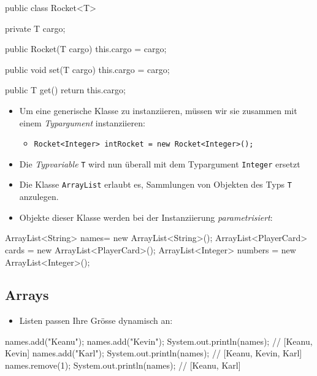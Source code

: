 \documentclass[a4paper,10pt, dvipsnames]{report}
\newcommand{\javaInLine}[1]{\texttt{#1}}
\begin{document}
\begin{javacodebox}
public class Rocket<T> {

    private T cargo;

    public Rocket(T cargo) {
    this.cargo = cargo;
    }

    public void set(T cargo) {
    this.cargo = cargo;
    }

    public T get() {
    return this.cargo;
    }
}
\end{javacodebox}

\begin{itemize}
    \item Um eine generische Klasse zu instanziieren, müssen wir sie zusammen mit einem \textit{Typargument} instanziieren:
    \begin{itemize}
        \item \javaInLine{Rocket<Integer> intRocket = new Rocket<Integer>();}
    \end{itemize}
    \item Die \textit{Typvariable} \javaInLine{T} wird nun überall mit dem Typargument \javaInLine{Integer} ersetzt
    \item Die Klasse \javaInLine{ArrayList} erlaubt es, Sammlungen von Objekten des Typs \javaInLine{T} anzulegen.
    \item Objekte dieser Klasse werden bei der Instanziierung \textit{parametrisiert}:
\end{itemize}

\begin{javacodebox}
ArrayList<String> names= new ArrayList<String>();
ArrayList<PlayerCard> cards = new ArrayList<PlayerCard>();
ArrayList<Integer> numbers = new ArrayList<Integer>();
\end{javacodebox}

\subsection{Arrays}

\begin{itemize}
    \item Listen passen Ihre Grösse dynamisch an:
\end{itemize}

\begin{javacodebox}
names.add("Keanu");
names.add("Kevin");
System.out.println(names); // [Keanu, Kevin]
names.add("Karl");
System.out.println(names); // [Keanu, Kevin, Karl]
names.remove(1);
System.out.println(names); // [Keanu, Karl]
\end{javacodebox}
\end{document}

